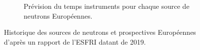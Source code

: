 \begin{figure}[!ht]
\begin{subfigure}[t]{0.5\textwidth}
		\caption[]{Prévision du temps instruments pour chaque source de neutrons Européennes.}
		\label{sumfr:fig:NeutronSources_b}
	\end{subfigure}
	\caption[]{Historique des sources de neutrons et prospectives Européennes  d'après un rapport de l'ESFRI datant de 2019.}
	\label{sumfr:fig:NeutronSources}
\end{figure}
